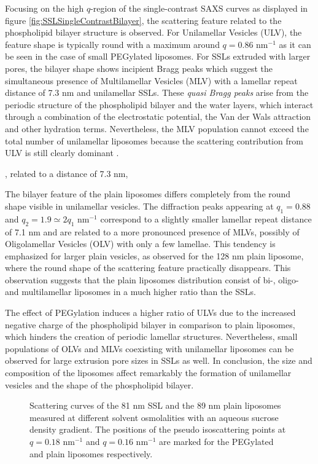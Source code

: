 Focusing on the high $q$-region of the single-contrast SAXS curves as displayed in figure \ref{fig:SSLSingleContrastBilayer}, the scattering feature related to the phospholipid bilayer structure is observed. For Unilamellar Vesicles (ULV), the feature shape is typically round with a maximum around $q=0.86$ nm$^{-1}$ \citep{varga_characterization_2012} as it can be seen in the case of small PEGylated liposomes. For SSLs extruded with larger pores, the bilayer shape shows incipient Bragg peaks which suggest the simultaneous presence of Multilamellar Vesicles (MLV) with a lamellar repeat distance of 7.3 nm and unilamellar SSLs.  These \emph{quasi Bragg peaks} arise from the periodic structure of the phospholipid bilayer and the water layers, which interact through a combination of the electrostatic potential, the Van der Wals attraction and other hydration terms. Nevertheless, the MLV population cannot exceed the total number of unilamellar liposomes because the scattering contribution from ULV is still clearly dominant \citep{sakuragi_transformation_2011}.

, related to a distance of 7.3 nm,

The bilayer feature of the plain liposomes differs completely from the round shape visible in unilamellar vesicles. The diffraction peaks appearing at $q_1=0.88$ and $q_2=1.9\simeq2q_1$ nm$^{-1}$ correspond to a slightly smaller lamellar repeat distance of 7.1 nm and are related to a more pronounced presence of MLVs, possibly of Oligolamellar Vesicles (OLV) with only a few lamellae. This tendency is emphasized for larger plain vesicles, as observed for the 128 nm plain liposome, where the round shape of the scattering feature practically disappears. This observation suggests that the plain liposomes distribution consist of bi-, oligo- and multilamellar liposomes in a much higher ratio than the SSLs.

The effect of PEGylation induces a higher ratio of ULVs due to the increased negative charge of the phospholipid bilayer in comparison to plain liposomes, which hinders the creation of periodic lamellar structures. Nevertheless, small populations of OLVs and MLVs coexisting with unilamellar liposomes can be observed for large extrusion pore sizes in SSLs as well. In conclusion, the size and composition of the liposomes affect remarkably the formation of unilamellar vesicles and the shape of the phospholipid bilayer.

\begin{figure}
	\centering
		\subfloat[SSL 81 nm]{\resizebox{0.46\linewidth}{!}{\figfont{13pt}}\label{fig:SSLContinuousSAXS}}
		\subfloat[Plain 89 nm]{\resizebox{0.46\linewidth}{!}{\figfont{13pt}}\label{fig:PlainLiposomeContinuousSAXS}}
		\caption[Scattering curves of the liposomes measured at different solvent osmolalities.]{Scattering curves of the 81 nm SSL and the 89 nm plain liposomes measured at different solvent osmolalities with an aqueous sucrose density gradient. The positions of the pseudo isoscattering points at $q=0.18$ nm$^{-1}$ and $q=0.16$ nm$^{-1}$ are marked for the PEGylated and plain liposomes respectively.}
\end{figure}

